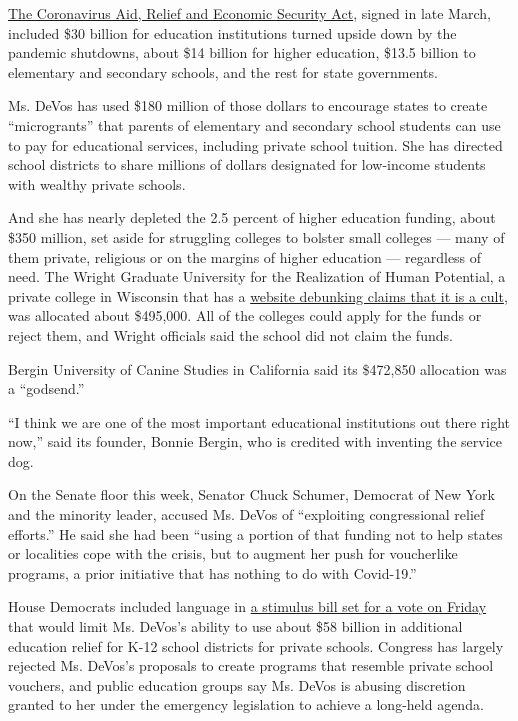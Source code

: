 \href{https://www.nytimes3xbfgragh.onion/2020/03/27/us/politics/coronavirus-house-voting.html}{The
Coronavirus Aid, Relief and Economic Security Act}, signed in late
March, included \$30 billion for education institutions turned upside
down by the pandemic shutdowns, about \$14 billion for higher education,
\$13.5 billion to elementary and secondary schools, and the rest for
state governments.

Ms. DeVos has used \$180 million of those dollars to encourage states to
create ``microgrants'' that parents of elementary and secondary school
students can use to pay for educational services, including private
school tuition. She has directed school districts to share millions of
dollars designated for low-income students with wealthy private schools.

And she has nearly depleted the 2.5 percent of higher education funding,
about \$350 million, set aside for struggling colleges to bolster small
colleges --- many of them private, religious or on the margins of higher
education --- regardless of need. The Wright Graduate University for the
Realization of Human Potential, a private college in Wisconsin that has
a \href{http://www.wrightinstitutecult.com}{website debunking claims
that it is a cult}, was allocated about \$495,000. All of the colleges
could apply for the funds or reject them, and Wright officials said the
school did not claim the funds.

Bergin University of Canine Studies in California said its \$472,850
allocation was a ``godsend.''

``I think we are one of the most important educational institutions out
there right now,'' said its founder, Bonnie Bergin, who is credited with
inventing the service dog.

On the Senate floor this week, Senator Chuck Schumer, Democrat of New
York and the minority leader, accused Ms. DeVos of ``exploiting
congressional relief efforts.'' He said she had been ``using a portion
of that funding not to help states or localities cope with the crisis,
but to augment her push for voucherlike programs, a prior initiative
that has nothing to do with Covid-19.''

House Democrats included language in
\href{https://docs.house.gov/billsthisweek/20200511/BILLS-116hr6800ih.pdf}{a
stimulus bill set for a vote on Friday} that would limit Ms. DeVos's
ability to use about \$58 billion in additional education relief for
K-12 school districts for private schools. Congress has largely rejected
Ms. DeVos's proposals to create programs that resemble private school
vouchers, and public education groups say Ms. DeVos is abusing
discretion granted to her under the emergency legislation to achieve a
long-held agenda.

